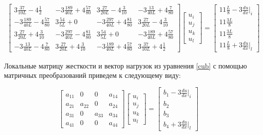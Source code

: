 \begin{align}\label{cub}
\begin{bmatrix}3\frac{37}{10L} -4  \frac{1}{2} &   -3 \frac{189}{40L} +4  \frac{57}{80} & 3\frac{27}{20L} -4  \frac{3}{10} &   -3 \frac{13}{40L}  +4   \frac{7}{80}\\
	  -3 \frac{189}{40L}  -4  \frac{57}{80} & 3\frac{54}{5L}+0 &   -3 \frac{297}{40L} +4  \frac{81}{80} & 3\frac{27}{20L}  -4  \frac{3}{10} \\
	3\frac{27}{20L}  +4   \frac{3}{10} &   -3 \frac{297}{40L} -4  \frac{81}{80} & 3\frac{54}{5L}+0 &   -3 \frac{189}{40L}  +4  \frac{57}{80} \\
	  -3 \frac{13}{40L}  -4  \frac{7}{80} & 3\frac{27}{20L} +4  \frac{3}{10} &   -3 \frac{189}{40L} +4  \frac{57}{80} & 3\frac{37}{10L}  +4  \frac{1}{2}
\end{bmatrix}
\begin{bmatrix}
	u_i \\
	u_j \\
	u_k\\
	u_l
\end{bmatrix}
=
\begin{bmatrix}
    11\frac{L}{8}   -3  \frac{du}{dx}|_i \\
	11\frac{3L}{8}\\
	11\frac{3L}{8}\\
	11\frac{L}{8}   +3  \frac{du}{dx}|_l
\end{bmatrix}
\end{align}

Локальные матрицу жесткости и вектор нагрузок из уравнения \ref{cub} с помощью матричных преобразований приведем к следующему виду:

$$ \begin{bmatrix}
a_{11}     &  0  & 0  &  a_{14}\\
a_{21}     &  a_{22}  & 0  &  a_{24}\\
a_{31}     &  0  &  a_{33} &  a_{34}\\
a_{41}     &  0  & 0  &  a_{44}
\end{bmatrix}
\begin{bmatrix}
u_i \\
u_j \\
u_k\\
u_l
\end{bmatrix} =
\begin{bmatrix}
b_1   -3  \frac{du}{dx}|_i \\
b_2\\
b_3\\
b_4   +3  \frac{du}{dx}|_l
\end{bmatrix}$$

